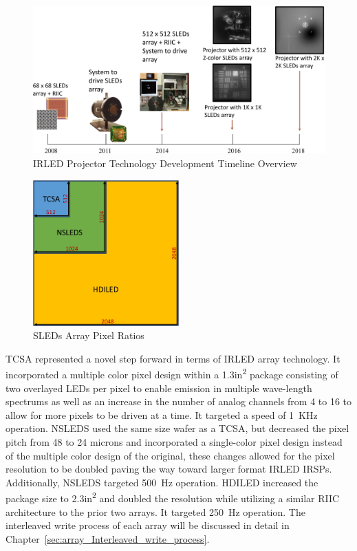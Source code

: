     \begin{figure}
        \centering
        \includegraphics[width=1.0\textwidth]{fig/sleds_timeline.pdf}
        \caption{IRLED Projector Technology Development Timeline Overview}
        \label{fig:sleds_timeline}
    \end{figure}

    \begin{figure}
        \centering
        \includegraphics[width=0.5\textwidth]{fig/tcsa_nsleds_hdiled_array_ratio.pdf}
        \caption{SLEDs Array Pixel Ratios}
        \label{fig:tcsa_nsleds_hdiled_array_ratio}
    \end{figure}

    TCSA represented a novel step forward in terms of IRLED array technology. It incorporated a multiple color pixel design within a 1.3in\textsuperscript{2} package consisting of two overlayed LEDs per pixel to enable emission in multiple wave-length spectrums as well as an increase in the number of analog channels from 4 to 16 to allow for more pixels to be driven at a time. It targeted a speed of \mbox{1 KHz} operation. NSLEDS used the same size wafer as a TCSA, but decreased the pixel pitch from 48 to 24 microns and incorporated a single-color pixel design instead of the multiple color design of the original, these changes allowed for the pixel resolution to be doubled paving the way toward larger format IRLED IRSPs. Additionally, NSLEDS targeted \mbox{500 Hz} operation. HDILED increased the package size to 2.3in\textsuperscript{2} and doubled the resolution while utilizing a similar RIIC architecture to the prior two arrays. It targeted \mbox{250 Hz} operation. The interleaved write process of each array will be discussed in detail in Chapter~\ref{sec:array_Interleaved_write_process}.

